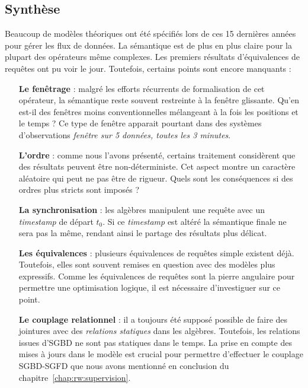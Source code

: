 \subsection{Synthèse}\label{sec:rw:sgfd:modeles:synthese}
Beaucoup de modèles théoriques ont été spécifiés lors de ces 15 dernières années pour gérer les flux de données. La sémantique est de plus en plus claire pour la plupart des opérateurs même complexes. Les premiers résultats d'équivalences de requêtes ont pu voir le jour. Toutefois, certains points sont encore manquants :
\begin{itemize}
 \item[\textbf{Le fenêtrage}] : malgré les efforts récurrents de formalisation de cet opérateur, la sémantique reste souvent restreinte à la fenêtre glissante. Qu'en est-il des fenêtres moins conventionnelles mélangeant à la fois les positions et le temps ? Ce type de fenêtre apparait pourtant dans des systèmes d'observations \textit{fenêtre sur 5 données, toutes les 3 minutes}.
 \item[\textbf{L'ordre}] : comme nous l'avons présenté, certains traitement considèrent que des résultats peuvent être non-déterministe. Cet aspect montre un caractère aléatoire qui peut ne pas être de rigueur. Quels sont les conséquences si des ordres plus stricts sont imposés ?
 \item[\textbf{La synchronisation}] : les algèbres manipulent une requête avec un \textit{timestamp} de départ $t_0$. Si ce \textit{timestamp} est altéré la sémantique finale ne sera pas la même, rendant ainsi le partage des résultats plus délicat.
 \item[\textbf{Les équivalences}] : plusieurs équivalences de requêtes simple existent déjà. Toutefois, elles sont souvent remises en question avec des modèles plus expressifs. Comme les équivalences de requêtes sont la pierre angulaire pour permettre une optimisation logique, il est nécessaire d'investiguer sur ce point.
 \item[\textbf{Le couplage relationnel}] : il a toujours été supposé possible de faire des jointures avec des \textit{relations statiques} dans les algèbres. Toutefois, les relations issues d'SGBD ne sont pas statiques dans le temps. La prise en compte des mises à jours dans le modèle est crucial pour permettre d'effectuer le couplage SGBD-SGFD que nous avons mentionné en conclusion du chapitre~\ref{chap:rw:supervision}.
\end{itemize}

